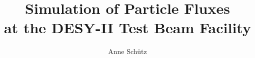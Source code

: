\documentclass[english,draft]{sdqthesis}
\author{Anne Schütz}
\title{\LARGE Simulation of Particle Fluxes\\at the DESY-II Test Beam Facility}
\begin{document}
\setpdf

\maketitle
	
\frontmatter


\end{document}
